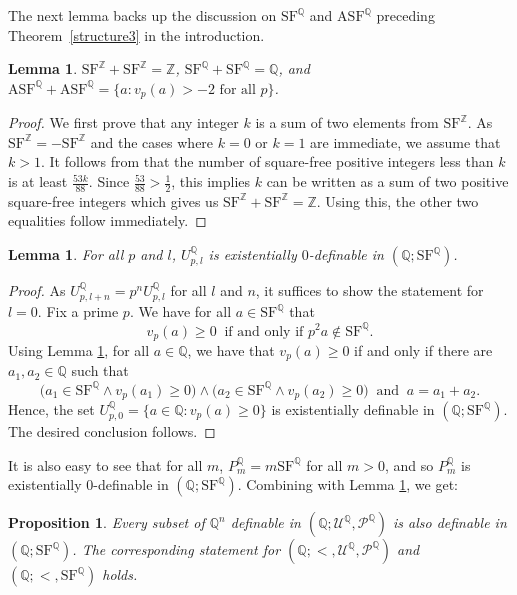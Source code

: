 \documentclass[letterpaper]{amsart}
\newcommand{\qq}{\mathbb{Q}}
\newcommand{\zz}{\mathbb{Z}}
\newcommand{\sU}{\mathscr{U}}
\newcommand{\sP}{\mathscr{P}}
\newcommand{\SF}{\mathrm{SF}^\zz}
\newcommand{\SQ}{\mathrm{SF}^\qq}
\newtheorem{lem}[thm]{Lemma}
\newtheorem{prop}[thm]{Proposition}
\begin{document}
\medskip \noindent 
The next lemma backs up the discussion on $\SQ$ and $\mathrm{ASF}^\qq$ preceding Theorem~\ref{structure3} in the introduction.
\begin{lem} \label{sumoftwosquarefree}
$\SF+\SF = \zz$, $\SQ+\SQ= \qq$, and $\mathrm{ASF}^\qq + \mathrm{ASF}^\qq=\{ a : v_p(a) >-2 \text{ for all } p\}$.
\end{lem}
\begin{proof}
We first prove that any integer $k$ is a sum of two elements from $\SF$. As $\SF = -\SF$ and the cases where $k=0$ or $k=1$ are immediate, we assume that $k>1$. It follows from \cite{Schrinelmanndensity} that the number of square-free positive integers less than $k$ is at least $\frac{53k}{88}$. Since $\frac{53}{88} > \frac{1}{2}$, this implies $k$ can be written as a sum of two positive square-free integers which gives us $\SF+\SF = \zz$. Using this, the other two equalities follow immediately.
\end{proof}

\begin{lem} \label{Definabilityofvaluation}
For all $p$ and $l$, $U^\qq_{p,l}$ is existentially $0$-definable in $( \qq; \SQ)$.
\end{lem}
\begin{proof}
As $U^\qq_{p, l+n} = p^nU^\qq_{p, l}$ for all $l$ and $n$, it suffices to show the statement for  $l=0$. Fix a prime $p$. We have for all $a \in \SQ$ that
$$  v_p(a) \geq 0  \  \text { if and only if } p^2 a \notin \SQ. $$ 
Using Lemma \ref{sumoftwosquarefree}, for all $a \in \qq$,  we have that $v_p(a) \geq 0$ if and only if there are $a_1, a_2 \in \qq$ such that   
$$ \big(a_1\in \SQ \wedge v_p(a_1) \geq 0\big) \wedge \big(a_2\in \SQ \wedge v_p(a_2) \geq 0\big) \ \text{ and  } \ a =a_1+a_2. $$
Hence, the set $U^\qq_{p, 0} = \{a \in \qq : v_p(a) \geq 0 \} $ is existentially definable in $(\qq; \SQ)$. The desired conclusion follows.
\end{proof}

\noindent It is also easy to see that for all $m$, $P_m^\qq = m \SQ$ for all $m>0$,  and so $P_m^\qq$ is existentially $0$-definable in $(\qq; \SQ)$. Combining with Lemma \ref{Definabilityofvaluation}, we get:

\begin{prop}\label{notintroducingnewdefinableset}
Every subset of $\qq^n$ definable in $(\qq; \sU^\qq, \sP^\qq)$ is also definable in $( \qq; \SQ)$. The corresponding statement for $(\qq; <, \sU^\qq, \sP^\qq)$ and $(\qq; <, \SQ)$ holds.
\end{prop}
\end{document}
